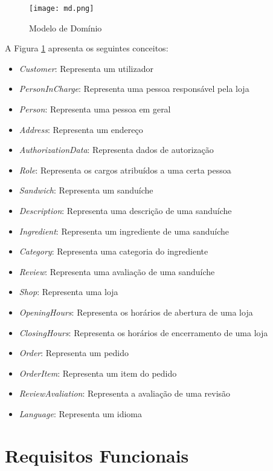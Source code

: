 \begin{figure}[H]
    \texttt{[image: md.png]}
    \caption{Modelo de Domínio}
    \label{fig:md}
\end{figure}

A Figura \ref{fig:md} apresenta os seguintes conceitos:
\begin{itemize}
    \item \textit{Customer}: Representa um utilizador
    \item \textit{PersonInCharge}: Representa uma pessoa responsável pela loja
    \item \textit{Person}: Representa uma pessoa em geral
    \item \textit{Address}: Representa um endereço
    \item \textit{AuthorizationData}: Representa dados de autorização
    \item \textit{Role}: Representa os cargos atribuídos a uma certa pessoa
    \item \textit{Sandwich}: Representa um sanduíche
    \item \textit{Description}: Representa uma descrição de uma sanduíche
    \item \textit{Ingredient}: Representa um ingrediente de uma sanduíche
    \item \textit{Category}: Representa uma categoria do ingrediente
    \item \textit{Review}: Representa uma avaliação de uma sanduíche
    \item \textit{Shop}: Representa uma loja
    \item \textit{OpeningHours}: Representa os horários de abertura de uma loja
    \item \textit{ClosingHours}: Representa os horários de encerramento de uma loja
    \item \textit{Order}: Representa um pedido
    \item \textit{OrderItem}: Representa um item do pedido
    \item \textit{ReviewAvaliation}: Representa a avaliação de uma revisão
    \item \textit{Language}: Representa um idioma
\end{itemize}

\section{Requisitos Funcionais}

